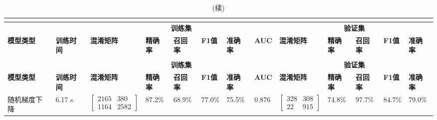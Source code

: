 \begin{landscape}
      \begin{longtable}{m{3cm}<{\centering}m{1.7cm}<{\centering}m{2.3cm}<{\centering}m{1cm}<{\centering}m{1cm}<{\centering}m{1cm}<{\centering}m{1cm}<{\centering}m{1cm}<{\centering}m{2cm}<{\centering}m{1cm}<{\centering}m{1cm}<{\centering}m{1cm}<{\centering}m{1cm}<{\centering}}
            \caption{初筛结果}\\
            \label{tab:model_screen}\\
            \toprule
            &  & \multicolumn{6}{c}{\textbf{训练集}} & \multicolumn{5}{c}{\textbf{验证集}}                                                                                                                                                                                                      \\
            \multirow{-2}{*}{\textbf{模型类型}} & \multirow{-2}{*}{\textbf{训练时间}} & \textbf{混淆矩阵} &  \textbf{精确率} &  \textbf{召回率} &  \textbf{F1值} &  \textbf{准确率} &  \textbf{AUC} &  \textbf{混淆矩阵} &  \textbf{精确率} &  \textbf{召回率} &  \textbf{F1值} &  \textbf{准确率}    \\
            \midrule
            \endfirsthead
            \caption[]{(续)}\\
            \midrule
            &  & \multicolumn{6}{c}{\textbf{训练集}} & \multicolumn{5}{c}{\textbf{验证集}}                                                                                                                                                                                                      \\
            \multirow{-2}{*}{\textbf{模型类型}} & \multirow{-2}{*}{\textbf{训练时间}} & \textbf{混淆矩阵} &  \textbf{精确率} &  \textbf{召回率} &  \textbf{F1值} &  \textbf{准确率} &  \textbf{AUC} &  \textbf{混淆矩阵} &  \textbf{精确率} &  \textbf{召回率} &  \textbf{F1值} &  \textbf{准确率}    \\
            \midrule
            \endhead 
            \midrule
            \endfoot
            \bottomrule
            \endlastfoot
            随机梯度下降      &   6.17 s  &     $\left[ \begin{array}{cc} 2165 & 380 \\ 1164 & 2582 \end{array} \right]$ & 87.2\% & 68.9\% & 77.0\% & 75.5\% & 0.876 &
            $\left[ \begin{array}{cc} 328 & 308 \\ 22 & 915 \end{array} \right]$ & 74.8\% & 97.7\% & 84.7\% & 79.0\% \\

\end{longtable}
\end{landscape}

